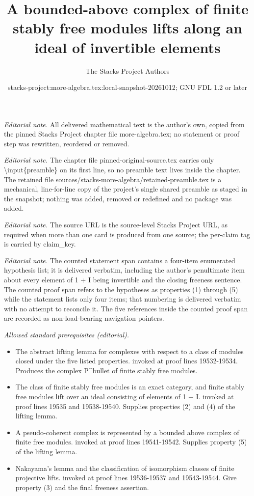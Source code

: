 \documentclass[10pt,a4paper]{amsart}
\title{A bounded-above complex of finite stably free modules lifts along an ideal of invertible elements}
\author{The Stacks Project Authors}
\date{stacks-project:more-algebra.tex:local-snapshot-20261012; GNU FDL 1.2 or later}
\theoremstyle{plain}
\theoremstyle{definition}
\theoremstyle{remark}
\numberwithin{equation}{subsection}
\begin{document}
\maketitle
\setcounter{subsection}{1}
\noindent\textit{Editorial note.} All delivered mathematical text is the author's own, copied from the pinned Stacks Project chapter file more-algebra.tex; no statement or proof step was rewritten, reordered or removed.\par\medskip
\noindent\textit{Editorial note.} The chapter file pinned-original-source.tex carries only \textbackslash{}input\{preamble\} on its first line, so no preamble text lives inside the chapter. The retained file sources/stacks-more-algebra/retained-preamble.tex is a mechanical, line-for-line copy of the project's single shared preamble as staged in the snapshot; nothing was added, removed or redefined and no package was added.\par\medskip
\noindent\textit{Editorial note.} The source URL is the source-level Stacks Project URL, as required when more than one card is produced from one source; the per-claim tag is carried by claim\_key.\par\medskip
\noindent\textit{Editorial note.} The counted statement span contains a four-item enumerated hypothesis list; it is delivered verbatim, including the author's penultimate item about every element of 1 + I being invertible and the closing freeness sentence. The counted proof span refers to the hypotheses as properties (1) through (5) while the statement lists only four items; that numbering is delivered verbatim with no attempt to reconcile it. The five references inside the counted proof span are recorded as non-load-bearing navigation pointers.\par\medskip
\noindent\textit{Allowed standard prerequisites (editorial).}\begin{itemize}
\item The abstract lifting lemma for complexes with respect to a class of modules closed under the five listed properties. invoked at proof lines 19532-19534. Produces the complex P\textasciicircum{}bullet of finite stably free modules.
\item The class of finite stably free modules is an exact category, and finite stably free modules lift over an ideal consisting of elements of 1 + I. invoked at proof lines 19535 and 19538-19540. Supplies properties (2) and (4) of the lifting lemma.
\item A pseudo-coherent complex is represented by a bounded above complex of finite free modules. invoked at proof lines 19541-19542. Supplies property (5) of the lifting lemma.
\item Nakayama's lemma and the classification of isomorphism classes of finite projective lifts. invoked at proof lines 19536-19537 and 19543-19544. Give property (3) and the final freeness assertion.
\end{itemize}\medskip
\end{document}
